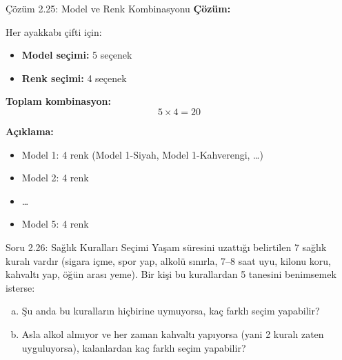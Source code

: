 \documentclass[light]{lutbeamer}
\begin{document}
\begin{frame}{Çözüm 2.25: Model ve Renk Kombinasyonu}
    \color{blue}
    \textbf{Çözüm:}
    
    Her ayakkabı çifti için:
    \begin{itemize}
        \item \textbf{Model seçimi:} 5 seçenek
        \item \textbf{Renk seçimi:} 4 seçenek
    \end{itemize}
    
    \vspace{0.3cm}
    \textbf{Toplam kombinasyon:}
    \[ 5 \times 4 = 20 \]
    
    \vspace{0.3cm}
    \textbf{Açıklama:}
    \begin{itemize}
        \item Model 1: 4 renk (Model 1-Siyah, Model 1-Kahverengi, \ldots)
        \item Model 2: 4 renk
        \item \ldots
        \item Model 5: 4 renk
    \end{itemize}
    
    \begin{center}
    \end{center}
\end{frame}

\begin{frame}{Soru 2.26: Sağlık Kuralları Seçimi}
    Yaşam süresini uzattığı belirtilen 7 sağlık kuralı vardır (sigara içme, spor yap, alkolü sınırla, 7--8 saat uyu, kilonu koru, kahvaltı yap, öğün arası yeme). Bir kişi bu kurallardan 5 tanesini benimsemek isterse:
    
    \begin{enumerate}[a)]
        \item Şu anda bu kuralların hiçbirine uymuyorsa, kaç farklı seçim yapabilir?
        \item Asla alkol almıyor ve her zaman kahvaltı yapıyorsa (yani 2 kuralı zaten uyguluyorsa), kalanlardan kaç farklı seçim yapabilir?
    \end{enumerate}
\end{frame}
\end{document}
